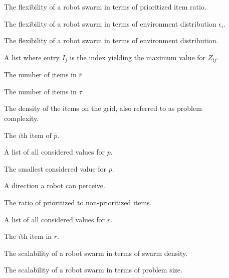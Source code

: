\begin{description}
	\item[\parbox{\namewidth}{$F_r$}] The flexibility of a robot swarm in terms of prioritized item ratio.
	
		
	\item[\parbox{\namewidth}{$F_{\epsilon_i}$}] The flexibility of a robot swarm in terms of environment distribution $\epsilon_i$.
	
	\item[\parbox{\namewidth}{$F_\epsilon$}] The flexibility of a robot swarm in terms of environment distribution.
	
	
	\item[\parbox{\namewidth}{$I$}] A list where entry $I_j$ is the index yielding the maximum value for $Z_{ij}$.
	
			
	\item[\parbox{\namewidth}{$n_r$}] The number of items in $\overline{r}$	
	
	\item[\parbox{\namewidth}{$n_\tau$}] The number of items in $\overline{\tau}$
	
	\item[\parbox{\namewidth}{$p$}] The density of the items on the grid, also referred to as problem complexity.

	\item[\parbox{\namewidth}{$p_i$}] The $i$th item of $\overline{p}$.

	\item[\parbox{\namewidth}{$\overline{p}$}] A list of all considered values for $p$.
	
	\item[\parbox{\namewidth}{$p_{min}$}] The smallest considered value for $p$.

	
	\item[\parbox{\namewidth}{$q$}] A direction a robot can perceive.
		
	\item[\parbox{\namewidth}{$r$}] The ratio of prioritized to non-prioritized items.

	\item[\parbox{\namewidth}{$\overline{r}$}] A list of all considered values for $r$.

	\item[\parbox{\namewidth}{$r_i$}] The $i$th item in $\overline{r}$.
	
	
	\item[\parbox{\namewidth}{$S_c$}] The scalability of a robot swarm in terms of swarm density.	
		
	\item[\parbox{\namewidth}{$S_p$}] The scalability of a robot swarm in terms of problem size.	
	

\end{description}
